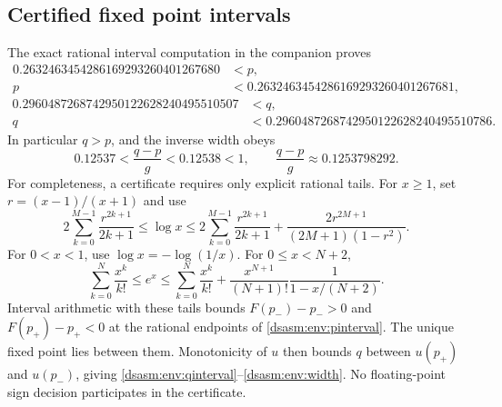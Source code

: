 \documentclass[11pt,letterpaper]{article}
\theoremstyle{remark}\newtheorem{remark}[theorem]{Remark}
\begin{document}
\subsection{Certified fixed point intervals}
The exact rational interval computation in the companion proves
\begin{equation}\label{dsasm:env:pinterval}
\begin{split}
 0.2632463454286169293260401267680&<p,\\
 p&<0.2632463454286169293260401267681,
\end{split}
\end{equation}
\begin{equation}\label{dsasm:env:qinterval}
\begin{split}
 0.2960487268742950122628240495510507&<q,\\
 q&<0.2960487268742950122628240495510786.
\end{split}
\end{equation}
In particular $q>p$, and the inverse width obeys
\begin{equation}\label{dsasm:env:width}
 0.12537<\frac{q-p}{g}<0.12538<1,
 \qquad \frac{q-p}{g}\approx0.1253798292.
\end{equation}
For completeness, a certificate requires only explicit rational tails.
For $x\ge1$, set $r=(x-1)/(x+1)$ and use
\[
 2\sum_{k=0}^{M-1}\frac{r^{2k+1}}{2k+1}
 \le\log x\le
 2\sum_{k=0}^{M-1}\frac{r^{2k+1}}{2k+1}
 +\frac{2r^{2M+1}}{(2M+1)(1-r^2)}.
\]
For $0<x<1$, use $\log x=-\log(1/x)$. For $0\le x<N+2$,
\[
 \sum_{k=0}^N\frac{x^k}{k!}\le e^x\le
 \sum_{k=0}^N\frac{x^k}{k!}
 +\frac{x^{N+1}}{(N+1)!}\frac1{1-x/(N+2)}.
\]
Interval arithmetic with these tails bounds $F(p_-)-p_->0$ and
$F(p_+)-p_+<0$ at the rational endpoints of \eqref{dsasm:env:pinterval}.
The unique fixed point lies between them. Monotonicity of $u$ then
bounds $q$ between $u(p_+)$ and $u(p_-)$, giving
\eqref{dsasm:env:qinterval}--\eqref{dsasm:env:width}. No floating-point sign decision
participates in the certificate.
\end{document}
